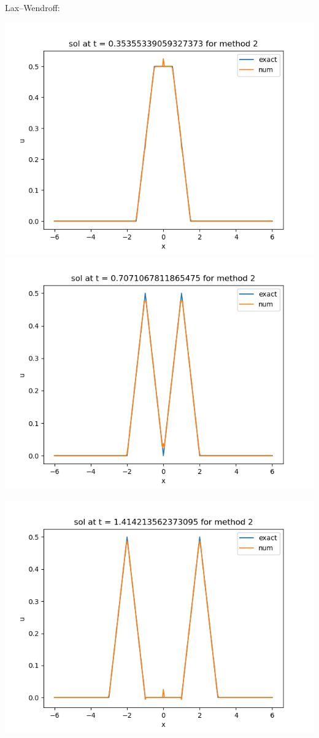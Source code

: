 \documentclass{article}
\begin{document}
\begin{enumerate}[label=(\alph*)]
Lax--Wendroff:
\begin{center}
	\includegraphics[scale=.4]{hw11 sol n = 10 method 2}
	\includegraphics[scale=.4]{hw11 sol n = 20 method 2}
\end{center}
\begin{center}
	\includegraphics[scale=.4]{hw11 sol n = 40 method 2}

\end{center}
\end{enumerate}
\end{document}
